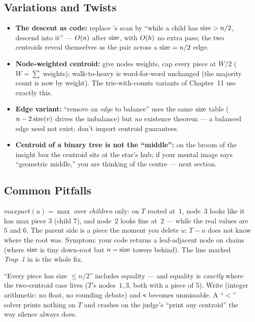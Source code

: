 \subsection{Variations and Twists}

\begin{itemize}[nosep]
  \item \textbf{The descent as code:} replace 's scan by ``while a
        child has $\operatorname{size} > n/2$, descend into it'' --- $O(n)$ after $\operatorname{size}$, with
        $O(h)$ no extra pass; the two centroids reveal themselves as the pair across
        a $\operatorname{size} = n/2$ edge. \hfill{}
  \item \textbf{Node-weighted centroid:} give nodes weights, cap every piece at $W/2$
        ($W = \sum$ weights); walk-to-heavy is word-for-word unchanged (the majority
        count is now by weight). The trie-with-counts variants of Chapter~11 use
        exactly this. \hfill{}
  \item \textbf{Edge variant:} ``remove an \emph{edge} to balance'' uses the same
        $\operatorname{size}$ table ($n - 2\operatorname{size}(v)$ drives the imbalance) but \emph{no} existence
        theorem --- a balanced edge need not exist; don't import centroid guarantees. \hfill{}
  \item \textbf{Centroid of a binary tree is not the ``middle'':} on the broom of the
        insight box the centroid sits at the star's hub; if your mental image says
        ``geometric middle,'' you are thinking of the centre --- next section. \hfill{}
\end{itemize}

\subsection{Common Pitfalls}

\begin{warningbox}
$\mathit{maxpart}(u) = \max$ over \emph{children} only: on $T$ rooted at~$1$, node~$3$
looks like it has max piece $3$ (child $7$), and node~$2$ looks fine at~$2$ --- while
the real values are $5$ and $6$. The parent side is a piece the moment you delete $u$:
$T - u$ does not know where the root was. Symptom: your code returns a leaf-adjacent
node on chains (where $\operatorname{size}$ is tiny down-root but $n - \operatorname{size}$ towers behind). The
line marked \emph{Trap~1} in  is the whole fix.
\end{warningbox}

\begin{warningbox}
``Every piece has size $\le n/2$'' includes equality --- and equality is \emph{exactly}
where the two-centroid case lives ($T$'s nodes~$1,3$, both with a piece of $5$). Write
 (integer arithmetic: no float, no rounding debate) and
\texttt{<} becomes unmissable. A ``$<$'' solver prints nothing on $T$ and crashes on
the judge's ``print any centroid'' the way silence always does.
\end{warningbox}

